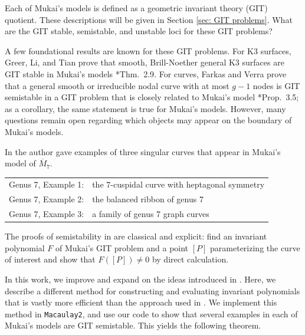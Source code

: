 \documentclass{amsart}[12pt]
\theoremstyle{definition}
\numberwithin{equation}{section}
\begin{document}
Each of Mukai's models is defined as a geometric invariant theory
(GIT) quotient. These descriptions will be given in Section \ref{sec:
  GIT problems}. What are the GIT stable, semistable, and unstable loci for these GIT problems? 

A few foundational results are known for these GIT problems. For K3 surfaces, Greer,
Li, and Tian prove that smooth, Brill-Noether general K3 surfaces are
GIT stable in Mukai's models \cite{GLT}*{Thm.~2.9}. For curves, Farkas and Verra prove
that a general smooth or irreducible nodal curve with at most $g-1$
nodes is GIT semistable in a GIT problem that is closely related to
Mukai's model \cite{FV}*{Prop.~3.5}; as a corollary, the same statement is true for Mukai's
models.  However, many questions remain open regarding which
objects may appear on the boundary of Mukai's models.


In \cite{Swinarski2025} the author gave examples of three singular
curves that appear in Mukai's model of $\overline{M}_7$. 
\begin{center}
\begin{tabular}{ll}
Genus 7, Example 1: & the $7$-cuspidal curve with heptagonal symmetry\\
Genus 7, Example 2: & the balanced ribbon of genus 7\\
Genus 7, Example 3: & a family of genus 7 graph curves
\end{tabular}
\end{center}

The proofs of semistability in \cite{Swinarski2025} are classical and
explicit: find an invariant polynomial $F$ of Mukai’s GIT problem and
a point $[P]$ parameterizing the curve of interest and show that
$F([P]) \neq 0$ by direct calculation.


In this work, we improve and expand on the ideas introduced in
\cite{Swinarski2025}. Here, we describe a different method for
constructing and evaluating invariant polynomials that is vastly more
efficient than the approach used in \cite{Swinarski2025}. We
implement this method in \texttt{Macaulay2}, and use our code to show that several
examples in each of Mukai's models are GIT semistable. This yields the
following theorem. 
\end{document}
